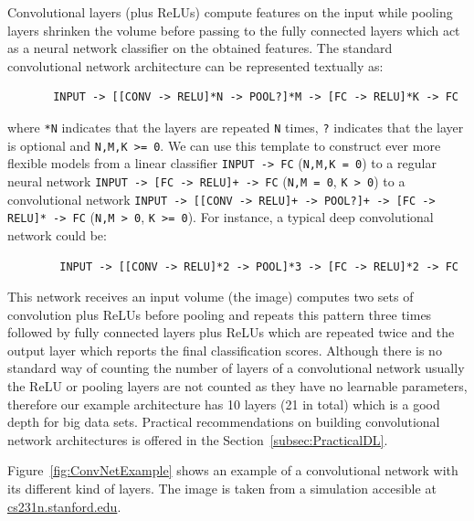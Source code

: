\bigskip
Convolutional layers (plus ReLUs) compute features on the input while pooling layers shrinken the volume before passing to the fully connected layers which act as a neural network classifier on the obtained features. The standard convolutional network architecture can be represented textually as:
\begin{verbatim}
       INPUT -> [[CONV -> RELU]*N -> POOL?]*M -> [FC -> RELU]*K -> FC
\end{verbatim}
where \texttt{*N} indicates that the layers are repeated \texttt{N} times, \texttt{?} indicates that the layer is optional and \texttt{N,M,K >= 0}. We can use this template to construct ever more flexible models from a linear classifier \texttt{INPUT -> FC} (\texttt{N,M,K = 0}) to a regular neural network \texttt{INPUT -> [FC -> RELU]+ -> FC} (\texttt{N,M = 0}, \texttt{K > 0}) to a convolutional network \texttt{INPUT -> [[CONV -> RELU]+ -> POOL?]+ -> [FC -> RELU]* -> FC} (\texttt{N,M > 0}, \texttt{K >= 0}). For instance, a typical deep convolutional network could be:
\begin{verbatim}
        INPUT -> [[CONV -> RELU]*2 -> POOL]*3 -> [FC -> RELU]*2 -> FC
\end{verbatim}
This network receives an input volume (the image) computes two sets of convolution plus ReLUs before pooling and repeats this pattern three times followed by fully connected layers plus ReLUs which are repeated twice and the output layer which reports the final classification scores. Although there is no standard way of counting the number of layers of a convolutional network usually the ReLU or pooling layers are not counted as they have no learnable parameters, therefore our example architecture has 10 layers (21 in total) which is a good depth for big data sets. Practical recommendations on building convolutional network architectures is offered in the Section~\ref{subsec:PracticalDL}.


Figure~\ref{fig:ConvNetExample} shows an example of a convolutional network with its different kind of layers. The image is taken from a simulation accesible at \url{cs231n.stanford.edu}.

